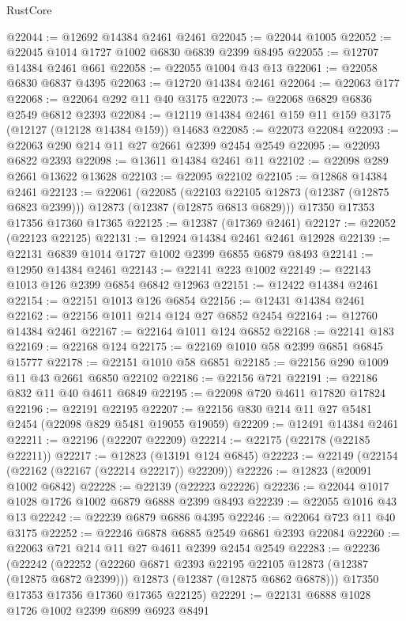 \begin{lexlean}{RustCore}
\begin{coremodule}
@22044 := @12692 @14384 @2461 @2461
@22045 := @22044 @1005
@22052 := @22045 @1014 @1727 @1002 @6830 @6839 @2399 @8495
@22055 := @12707 @14384 @2461 @661
@22058 := @22055 @1004 @43 @13
@22061 := @22058 @6830 @6837 @4395
@22063 := @12720 @14384 @2461
@22064 := @22063 @177
@22068 := @22064 @292 @11 @40 @3175
@22073 := @22068 @6829 @6836 @2549 @6812 @2393
@22084 := @12119 @14384 @2461 @159 @11 @159 @3175 (@12127 (@12128 @14384 @159)) @14683
@22085 := @22073 @22084
@22093 := @22063 @290 @214 @11 @27 @2661 @2399 @2454 @2549
@22095 := @22093 @6822 @2393
@22098 := @13611 @14384 @2461 @11
@22102 := @22098 @289 @2661 @13622 @13628
@22103 := @22095 @22102
@22105 := @12868 @14384 @2461
@22123 := @22061
    (@22085
      (@22103 @22105 @12873 (@12387 (@12875 @6823 @2399)))
      @12873
      (@12387 (@12875 @6813 @6829)))
    @17350
    @17353
    @17356
    @17360
    @17365
@22125 := @12387 (@17369 @2461)
@22127 := @22052 (@22123 @22125)
@22131 := @12924 @14384 @2461 @2461 @12928
@22139 := @22131 @6839 @1014 @1727 @1002 @2399 @6855 @6879 @8493
@22141 := @12950 @14384 @2461
@22143 := @22141 @223 @1002
@22149 := @22143 @1013 @126 @2399 @6854 @6842 @12963
@22151 := @12422 @14384 @2461
@22154 := @22151 @1013 @126 @6854
@22156 := @12431 @14384 @2461
@22162 := @22156 @1011 @214 @124 @27 @6852 @2454
@22164 := @12760 @14384 @2461
@22167 := @22164 @1011 @124 @6852
@22168 := @22141 @183
@22169 := @22168 @124
@22175 := @22169 @1010 @58 @2399 @6851 @6845 @15777
@22178 := @22151 @1010 @58 @6851
@22185 := @22156 @290 @1009 @11 @43 @2661 @6850 @22102
@22186 := @22156 @721
@22191 := @22186 @832 @11 @40 @4611 @6849
@22195 := @22098 @720 @4611 @17820 @17824
@22196 := @22191 @22195
@22207 := @22156 @830 @214 @11 @27 @5481 @2454 (@22098 @829 @5481 @19055 @19059)
@22209 := @12491 @14384 @2461
@22211 := @22196 (@22207 @22209)
@22214 := @22175 (@22178 (@22185 @22211))
@22217 := @12823 (@13191 @124 @6845)
@22223 := @22149 (@22154 (@22162 (@22167 (@22214 @22217)) @22209))
@22226 := @12823 (@20091 @1002 @6842)
@22228 := @22139 (@22223 @22226)
@22236 := @22044 @1017 @1028 @1726 @1002 @6879 @6888 @2399 @8493
@22239 := @22055 @1016 @43 @13
@22242 := @22239 @6879 @6886 @4395
@22246 := @22064 @723 @11 @40 @3175
@22252 := @22246 @6878 @6885 @2549 @6861 @2393 @22084
@22260 := @22063 @721 @214 @11 @27 @4611 @2399 @2454 @2549
@22283 := @22236
    (@22242
      (@22252
        (@22260 @6871 @2393 @22195 @22105 @12873 (@12387 (@12875 @6872 @2399)))
        @12873
        (@12387 (@12875 @6862 @6878)))
      @17350
      @17353
      @17356
      @17360
      @17365
      @22125)
@22291 := @22131 @6888 @1028 @1726 @1002 @2399 @6899 @6923 @8491

\end{coremodule}
\end{lexlean}
